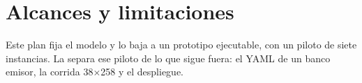\section{Alcances y limitaciones}
\label{sec:alcances}

Este plan fija el modelo y lo baja a un prototipo ejecutable, con un piloto de siete
instancias. La  separa ese piloto de lo que sigue fuera: el YAML de un
banco emisor, la corrida 38$\times$258 y el despliegue.


